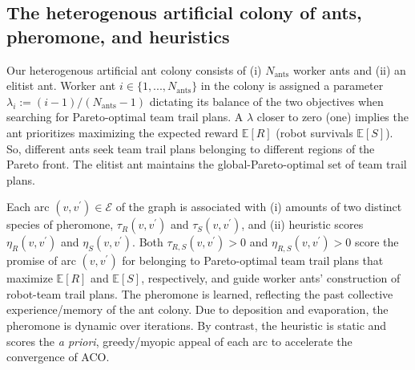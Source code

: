 \documentclass[11pt, oneside]{article}
\begin{document}
\subsection{The heterogenous artificial colony of ants, pheromone, and heuristics}
Our heterogenous artificial ant colony consists of (i) $N_{\text{ants}}$ worker ants and (ii) an elitist ant.
Worker ant $i\in\{1, ..., N_{\text{ants}}\}$ in the colony is assigned a parameter $\lambda_i := (i-1) / (N_{\text{ants}}-1)$ dictating its balance of the two objectives when searching for Pareto-optimal team trail plans.
A $\lambda$ closer to zero (one) implies the ant prioritizes maximizing the expected reward $\mathbb{E}[R]$ (robot survivals $\mathbb{E}[S]$). 
So, different ants seek team trail plans belonging to different regions of the Pareto front.
The elitist ant maintains the global-Pareto-optimal set of team trail plans.

Each arc $(v, v^\prime)\in\mathcal{E}$ of the graph is associated with 
(i) amounts of two distinct species of pheromone, $\tau_R(v, v^\prime)$ and $\tau_S(v, v^\prime)$, and 
(ii) heuristic scores $\eta_R(v, v^\prime)$ and $\eta_S(v, v^\prime)$.
Both $\tau_{R,S}(v, v^\prime)>0$ and $\eta_{R,S}(v, v^\prime)>0$ score the promise of arc $(v, v^\prime)$ for belonging to Pareto-optimal team trail plans that maximize $\mathbb{E}[R]$ and $\mathbb{E}[S]$, respectively, and guide worker ants' construction of robot-team trail plans.
The pheromone is learned, reflecting the past collective experience/memory of the ant colony. 
Due to deposition and evaporation, the pheromone is dynamic over iterations.
By contrast, the heuristic is static and scores the \emph{a priori}, greedy/myopic appeal of each arc to accelerate the convergence of ACO.
%
%
%
\end{document}
